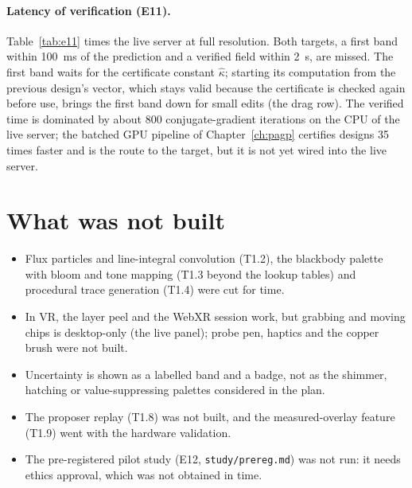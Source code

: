 

\paragraph{Latency of verification (E11).} Table~\ref{tab:e11} times the live server at full
resolution. Both targets, a first band within 100~ms of the prediction and a verified field within
2~s, are missed. The first band waits for the certificate constant $\hat\kappa$; starting its
computation from the previous design's vector, which stays valid because the certificate is
checked again before use, brings the first band down for small edits (the drag row). The verified
time is dominated by about 800 conjugate-gradient iterations on the CPU of the live server; the
batched GPU pipeline of Chapter~\ref{ch:pagp} certifies designs 35 times faster and is the route to
the target, but it is not yet wired into the live server.



\section{What was not built}
\begin{itemize}
\item Flux particles and line-integral convolution (T1.2), the blackbody palette with bloom and
tone mapping (T1.3 beyond the lookup tables) and procedural trace generation (T1.4) were cut for
time.
\item In VR, the layer peel and the WebXR session work, but grabbing and moving chips is
desktop-only (the live panel); probe pen, haptics and the copper brush were not built.
\item Uncertainty is shown as a labelled band and a badge, not as the shimmer, hatching or
value-suppressing palettes considered in the plan.
\item The proposer replay (T1.8) was not built, and the measured-overlay feature (T1.9) went with
the hardware validation.
\item The pre-registered pilot study (E12, \texttt{study/prereg.md}) was not run: it needs ethics
approval, which was not obtained in time.
\end{itemize}
